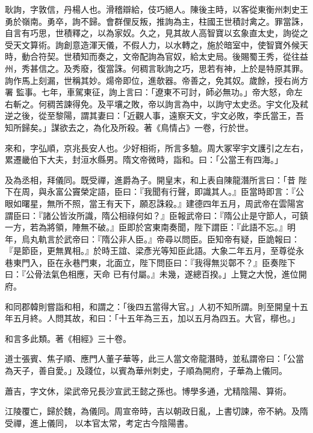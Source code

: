 \begin{pinyinscope}
 耿詢，字敦信，丹楊人也。滑稽辯給，伎巧絕人。陳後主時，以客從東衡州刺史王勇於嶺南。勇卒，詢不歸。會群俚反叛，推詢為主，柱國王世積討禽之。罪當誅，自言有巧思，世積釋之，以為家奴。久之，見其故人高智寶以玄象直太史，詢從之受天文算術。詢創意造渾天儀，不假人力，以水轉之，施於暗室中，使智寶外候天時，動合符契。世積知而奏之，文帝配詢為官奴，給太史局。後賜蜀王秀，從往益州，秀甚信之。及秀廢，復當誅。何稠言耿詢之巧，思若有神，上於是特原其罪。詢作馬上刻漏，世稱其妙。煬帝即位，進欹器。帝善之，免其奴。歲餘，授右尚方署
 監事。七年，車駕東征，詢上言曰：「遼東不可討，師必無功。」帝大怒，命左右斬之。何稠苦諫得免。及平壤之敗，帝以詢言為中，以詢守太史丞。宇文化及弒逆之後，從至黎陽，謂其妻曰：「近觀人事，遠察天文，宇文必敗，李氏當王，吾知所歸矣。」謀欲去之，為化及所殺。著《鳥情占》一卷，行於世。



 來和，字弘順，京兆長安人也。少好相術，所言多驗。周大冢宰宇文護引之左右，累遷畿伯下大夫，封洹水縣男。隋文帝微時，詣和。曰：「公當王有四海。」



 及為丞相，拜儀同。既受禪，進爵為子。開皇末，和上表自陳龍潛所言曰：「昔
 陛下在周，與永富公竇榮定語，臣曰：『我聞有行聲，即識其人。』臣當時即言：『公眼如曙星，無所不照，當王有天下，願忍誅殺。』建德四年五月，周武帝在雲陽宮謂臣曰：『諸公皆汝所識，隋公相祿何如？』臣報武帝曰：『隋公止是守節人，可鎮一方，若為將領，陣無不破。』臣即於宮東南奏聞，陛下謂臣：『此語不忘。』明年，烏丸軌言於武帝曰：『隋公非人臣。』帝尋以問臣。臣知帝有疑，臣詭報曰：『是節臣，更無異相。』於時王誼、梁彥光等知臣此語。大象二年五月，至尊從永巷東門入，臣在永巷門東，北面立，陛下問臣曰：『我得無災鄣不？』臣奏陛下曰：『公骨法氣色相應，天命
 已有付屬。』未幾，遂總百揆。」上覽之大悅，進位開府。



 和同郡韓則嘗詣和相，和謂之：「後四五當得大官。」人初不知所謂。則至開皇十五年五月終。人問其故，和曰：「十五年為三五，加以五月為四五。大官，槨也。」



 和言多此類。著《相經》三十卷。



 道士張賓、焦子順、應門人董子華等，此三人當文帝龍潛時，並私謂帝曰：「公當為天子，善自愛。」及踐位，以賓為華州刺史，子順為開府，子華為上儀同。



 蕭吉，字文休，梁武帝兄長沙宣武王懿之孫也。博學多通，尤精陰陽、算術。



 江陵覆亡，歸於魏，為儀同。周宣帝時，吉以朝政日亂，上書切諫，帝不納。及隋受禪，進上儀同，
 以本官太常，考定古今陰陽書。




\end{pinyinscope}

